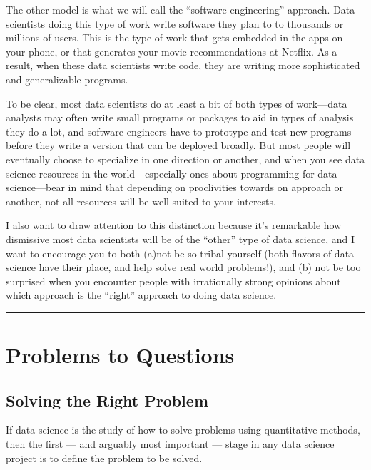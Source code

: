 \documentclass[letterpaper,10pt,english]{jupyterBook}
\begin{document}
\sphinxAtStartPar
The other model is what we will call the “software engineering” approach. Data scientists doing this type of work write software they plan to  to thousands or millions of users. This is the type of work that gets embedded in the apps on your phone, or that generates your movie recommendations at Netflix. As a result, when these data scientists write code, they are writing more sophisticated and generalizable programs.

\sphinxAtStartPar
To be clear, most data scientists do at least a bit of both types of work—data analysts may often write small programs or packages to aid in types of analysis they do a lot, and software engineers have to prototype and test new programs before they write a version that can be deployed broadly. But most people will eventually choose to specialize in one direction or another, and when you see data science resources in the world—especially ones about programming for data science—bear in mind that depending on  proclivities towards on approach or another, not all resources will be well suited to your interests.

\sphinxAtStartPar
I also want to draw attention to this distinction because it’s remarkable how dismissive most data scientists will be of the “other” type of data science, and I want to encourage you to both (a)not be so tribal yourself (both flavors of data science have their place, and help solve real world problems!), and (b) not be too surprised when you encounter people with irrationally strong opinions about which approach is the “right” approach to doing data science.


\bigskip\hrule\bigskip


\sphinxstepscope


\part{Problems to Questions}

\sphinxstepscope


\chapter{Solving the Right Problem}
\label{\detokenize{20_problems_to_questions/10_solving_the_right_problem:solving-the-right-problem}}\label{\detokenize{20_problems_to_questions/10_solving_the_right_problem::doc}}
\sphinxAtStartPar
If data science is the study of how to solve problems using quantitative methods, then the first — and arguably most important — stage in any data science project is to define the problem to be solved.
\end{document}
